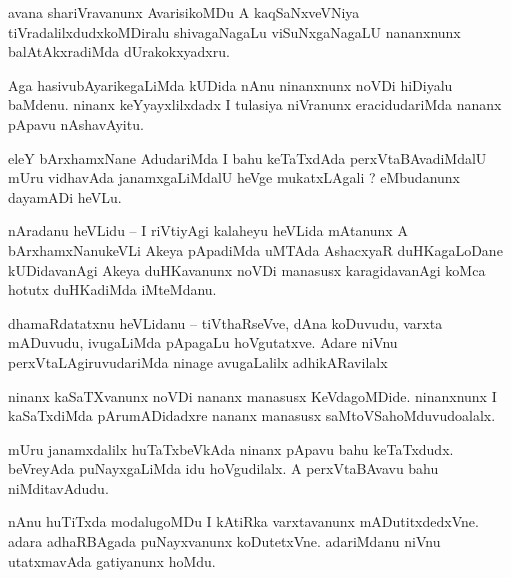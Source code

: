 \documentclass{article}
\begin{document}
\begin{mn}%
avana shariVravanunx AvarisikoMDu A kaqSaNxveVNiya tiVradalilxdudxkoMDiralu shivagaNagaLu 
viSuNxgaNagaLU nananxnunx balAtAkxradiMda dUrakokxyadxru.
\end{mn}

\begin{mn}%
Aga hasivubAyarikegaLiMda kUDida nAnu ninanxnunx noVDi hiDiyalu baMdenu. ninanx keYyayxlilxdadx I 
tulasiya niVranunx eracidudariMda nananx pApavu nAshavAyitu.
\end{mn}

\begin{mn}%
eleY bArxhamxNane AdudariMda I bahu keTaTxdAda perxVtaBAvadiMdalU mUru vidhavAda janamxgaLiMdalU 
heVge mukatxLAgali ? eMbudanunx dayamADi heVLu.
\end{mn}

\begin{mn}%
nAradanu heVLidu -- I riVtiyAgi kalaheyu heVLida mAtanunx A bArxhamxNanukeVLi Akeya pApadiMda 
uMTAda AshacxyaR duHKagaLoDane kUDidavanAgi Akeya duHKavanunx noVDi manasusx karagidavanAgi koMca 
hotutx duHKadiMda iMteMdanu.
\end{mn}


\begin{mn}%
dhamaRdatatxnu heVLidanu -- tiVthaRseVve, dAna koDuvudu, varxta mADuvudu, ivugaLiMda pApagaLu 
hoVgutatxve. Adare niVnu perxVtaLAgiruvudariMda ninage avugaLalilx adhikARavilalx
\end{mn}

\begin{mn}%
ninanx kaSaTXvanunx noVDi nananx manasusx KeVdagoMDide. ninanxnunx I kaSaTxdiMda pArumADidadxre 
nananx manasusx saMtoVSahoMduvudoalalx.
\end{mn}

\begin{mn}%
mUru janamxdalilx huTaTxbeVkAda ninanx pApavu bahu keTaTxdudx. beVreyAda puNayxgaLiMda idu 
hoVgudilalx. A perxVtaBAvavu bahu niMditavAdudu.
\end{mn}

\begin{mn}%
nAnu huTiTxda modalugoMDu I kAtiRka varxtavanunx mADutitxdedxVne. adara adhaRBAgada puNayxvanunx 
koDutetxVne. adariMdanu niVnu utatxmavAda gatiyanunx hoMdu.
\end{mn}
\end{document}
